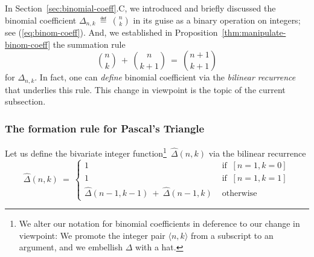 In Section~\ref{sec:binomial-coeff}.C, we introduced and briefly
discussed the binomial coefficient 
$\displaystyle \Delta_{n,k} \ \eqdef \ {n \choose k}$ in its guise as a
binary operation on integers; see (\ref{eq:binom-coeff}).  And, we
established in Proposition~\ref{thm:manipulate-binom-coeff} the
summation rule
\[ {n \choose k} \ + \ {n \choose {k+1}} \ = \ {{n+1} \choose {k+1}} \]
for $\Delta_{n,k}$.  In fact, one can {\em define} binomial
coefficient via the {\em bilinear recurrence} that underlies this
rule.  This change in viewpoint is the topic of the current
subsection.

\subsubsection{The formation rule for Pascal's Triangle}
\label{sec:Pascal-formation}

Let us define the bivariate integer function\footnote{We alter our
  notation for binomial coefficients in deference to our change in
  viewpoint: We promote the integer pair $\langle n,k \rangle$ from a
  subscript to an argument, and we embellish $\Delta$ with a
  hat.}~$\hat{\Delta}(n,k)$ via the bilinear recurrence
\begin{equation}
\label{eq:binom-coeff-recurrence}
\hat{\Delta}(n,k) \ = \ 
\left\{
\begin{array}{cl}
1  & \mbox{ if } \ [n=1, k=0] \\
1  & \mbox{ if } \ [n=1, k=1] \\
\hat{\Delta}(n-1, k-1) \ + \  \hat{\Delta}(n-1,k) & \mbox{ otherwise}
\end{array}
\right.
\end{equation}

\smallskip

